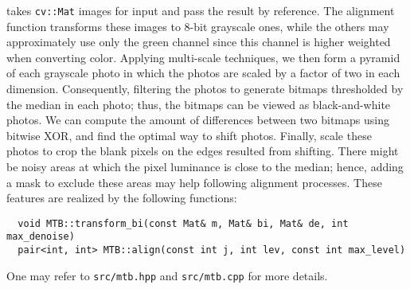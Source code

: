 \documentclass[11pt]{article}
\begin{document}
takes \texttt{cv::Mat} images for input and pass the result by reference. The alignment function transforms these images to 8-bit grayscale ones, while the others may approximately use only the green channel since this channel is higher weighted when converting color. Applying multi-scale techniques, we then form a pyramid of each grayscale photo in which the photos are scaled by a factor of two in each dimension. Consequently, filtering the photos to generate bitmaps thresholded by the median in each photo; thus, the bitmaps can be viewed as black-and-white photos. We can compute the amount of differences between two bitmaps using bitwise XOR, and find the optimal way to shift photos. Finally, scale these photos to crop the blank pixels on the edges resulted from shifting. There might be noisy areas at which the pixel luminance is close to the median; hence, adding a mask to exclude these areas may help following alignment processes. These features are realized by the following functions:

\begin{lstlisting}
  void MTB::transform_bi(const Mat& m, Mat& bi, Mat& de, int max_denoise)
  pair<int, int> MTB::align(const int j, int lev, const int max_level)
\end{lstlisting}

One may refer to \texttt{src/mtb.hpp} and \texttt{src/mtb.cpp} for more details. 
\end{document}
